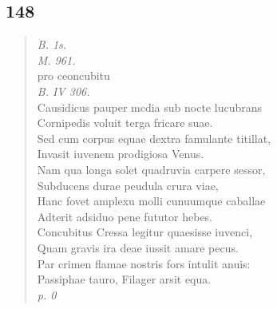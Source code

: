 \documentclass[11pt, a4paper]{report}
\begin{document}
            \subsection*{148}
      \begin{verse}
      \textit{B. 1s.} \\ \textit{M. 961.} \\ pro ceoncubitu \\ \textit{B. IV 306.} \\ Causidicus pauper mcdia sub nocte lucubrans \\ Cornipedis voluit terga fricare suae. \\ Sed cum corpus equae dextra famulante titillat, \\ Invasit iuvenem prodigiosa Venus. \\ Nam qua longa solet quadruvia carpere sessor, \\ Subducens durae peudula crura viae, \\ Hanc fovet amplexu molli cunuumque caballae \\ Adterit adsiduo pene fututor hebes. \\ Concubitus Cressa legitur quaesisse iuvenci, \\ Quam gravis ira deae iussit amare pecus. \\ Par crimen flamae nostris fors intulit anuis: \\ Passiphae tauro, Filager arsit equa. \\ \textit{p. 0} \\ 
      \end{verse}
  
\end{document}
